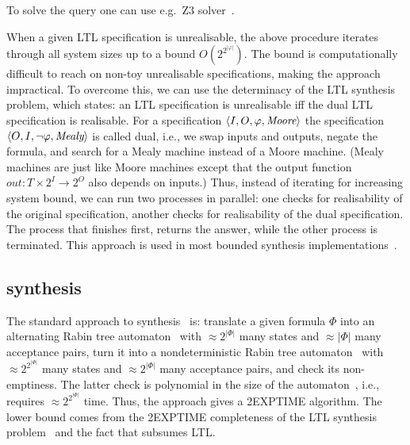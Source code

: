 To solve the query one can use e.g.\ Z3 solver~\cite{Moura08}.

\begin{remark}\label{rem:bosy-unreal}
When a given LTL specification is unrealisable,
the above procedure iterates through all system sizes up to a bound $O(2^{2^{|\varphi|}})$.
The bound is computationally difficult to reach on non-toy unrealisable specifications,
making the approach impractical.
To overcome this, we can use the determinacy of the LTL synthesis problem, which states:
an LTL specification is unrealisable iff the dual LTL specification is realisable.
For a specification $\left<I,O,\varphi,\textit{Moore}\right>$
the specification $\left<O,I,\neg\varphi,\textit{Mealy}\right>$
is called dual,
i.e., we swap inputs and outputs, negate the formula,
and search for a Mealy machine instead of a Moore machine.
(Mealy machines are just like Moore machines
 except that the output function $out: T\times 2^I \to 2^O$ also depends on inputs.)
Thus, instead of iterating for increasing system bound,
we can run two processes in parallel:
one checks for realisability of the original specification,
another checks for realisability of the dual specification.
The process that finishes first,
returns the answer, while the other process is terminated.
This approach is used in most bounded synthesis implementations~\cite{syntcomp}.
\end{remark}


\subsection*{\CTLstar synthesis}

The standard approach to \CTLstar synthesis~\cite{informatio} is:
translate a given \CTLstar formula $\Phi$ into an alternating Rabin tree automaton~\cite{ATA}
with $\approx 2^{|\Phi|}$ many states and $\approx|\Phi|$ many acceptance pairs,
turn it into a nondeterministic Rabin tree automaton~\cite{MS95}
with $\approx2^{2^{|\Phi|}}$ many states and $\approx2^{|\Phi|}$ many acceptance pairs,
and check its non-emptiness.
The latter check is polynomial in the size of the automaton~\cite{EJ99,DBLP:conf/popl/PnueliR89},
i.e., requires $\approx2^{2^{|\Phi|}}$ time.
Thus, the approach gives a 2EXPTIME algorithm.
The lower bound comes from the 2EXPTIME completeness of the LTL synthesis problem~\cite{Pnueli1989,Vardi:1985:IUL:22145.22173}
and the fact that \CTLstar subsumes LTL.


